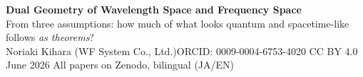 \documentclass[9pt]{extarticle}
\begin{document}
\begin{minipage}[t]{\textwidth}
\colorbox{accl}{\begin{minipage}{0.992\textwidth}\vspace{2pt}
{\LARGE\bfseries Dual Geometry of Wavelength Space and Frequency Space}\\[2pt]
{\large From three assumptions: how much of what looks quantum and spacetime-like follows \emph{as theorems}?}\\[2pt]
Noriaki Kihara (WF System Co., Ltd.)\quad ORCID: 0009-0004-6753-4020 \quad CC BY 4.0 \quad June 2026 \quad All papers on Zenodo, bilingual (JA/EN)
\vspace{2pt}\end{minipage}}
\end{minipage}
\end{document}
